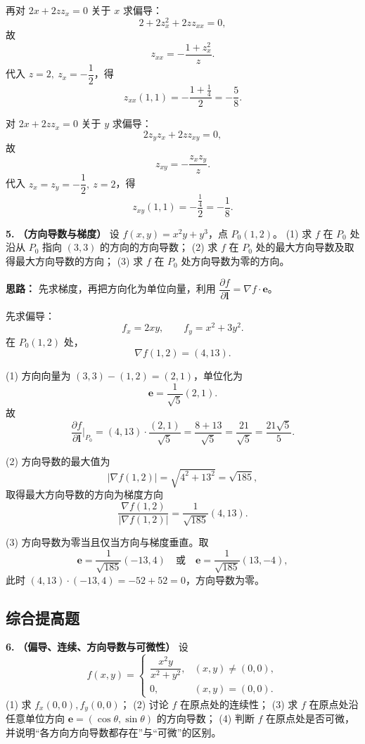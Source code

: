 再对 \(2x+2zz_x=0\) 关于 \(x\) 求偏导：
\[
2+2z_x^2+2zz_{xx}=0,
\]
故
\[
z_{xx}=-\frac{1+z_x^2}{z}.
\]
代入 \(z=2,\ z_x=-\dfrac12\)，得
\[
z_{xx}(1,1)=-\frac{1+\frac14}{2}=-\frac58.
\]

对 \(2x+2zz_x=0\) 关于 \(y\) 求偏导：
\[
2z_yz_x+2zz_{xy}=0,
\]
故
\[
z_{xy}=-\frac{z_xz_y}{z}.
\]
代入 \(z_x=z_y=-\dfrac12,\ z=2\)，得
\[
z_{xy}(1,1)=-\frac{\frac14}{2}=-\frac18.
\]

\else \answerarea[10] \fi%

\textbf{5.} \textbf{（方向导数与梯度）} 设 \(f(x,y)=x^2y+y^3\)，点 \(P_0(1,2)\)。
(1) 求 \(f\) 在 \(P_0\) 处沿从 \(P_0\) 指向 \((3,3)\) 的方向的方向导数；
(2) 求 \(f\) 在 \(P_0\) 处的最大方向导数及取得最大方向导数的方向；
(3) 求 \(f\) 在 \(P_0\) 处方向导数为零的方向。

\ifshowsolutions%
\textbf{思路：} 先求梯度，再把方向化为单位向量，利用 \(\dfrac{\partial f}{\partial\mathbf l}=\nabla f\cdot\mathbf e\)。

先求偏导：
\[
f_x=2xy,\qquad f_y=x^2+3y^2.
\]
在 \(P_0(1,2)\) 处，
\[
\nabla f(1,2)=(4,13).
\]

(1) 方向向量为 \((3,3)-(1,2)=(2,1)\)，单位化为
\[
\mathbf e=\frac{1}{\sqrt5}(2,1).
\]
故
\[
\frac{\partial f}{\partial\mathbf l}\bigg|_{P_0}
=(4,13)\cdot\frac{(2,1)}{\sqrt5}
=\frac{8+13}{\sqrt5}
=\frac{21}{\sqrt5}
=\frac{21\sqrt5}{5}.
\]

(2) 方向导数的最大值为
\[
|\nabla f(1,2)|=\sqrt{4^2+13^2}=\sqrt{185},
\]
取得最大方向导数的方向为梯度方向
\[
\frac{\nabla f(1,2)}{|\nabla f(1,2)|}
=\frac{1}{\sqrt{185}}(4,13).
\]

(3) 方向导数为零当且仅当方向与梯度垂直。取
\[
\mathbf e=\frac{1}{\sqrt{185}}(-13,4)
\quad\text{或}\quad
\mathbf e=\frac{1}{\sqrt{185}}(13,-4),
\]
此时 \((4,13)\cdot(-13,4)=-52+52=0\)，方向导数为零。

\else \answerarea[8] \fi%

\subsection{综合提高题}

\textbf{6.} \textbf{（偏导、连续、方向导数与可微性）} 设
\[
f(x,y)=\begin{cases}
\dfrac{x^2y}{x^2+y^2},&(x,y)\neq(0,0),\\[8pt]
0,&(x,y)=(0,0).
\end{cases}
\]
(1) 求 \(f_x(0,0),f_y(0,0)\)；
(2) 讨论 \(f\) 在原点处的连续性；
(3) 求 \(f\) 在原点处沿任意单位方向 \(\mathbf e=(\cos\theta,\sin\theta)\) 的方向导数；
(4) 判断 \(f\) 在原点处是否可微，并说明“各方向方向导数都存在”与“可微”的区别。

